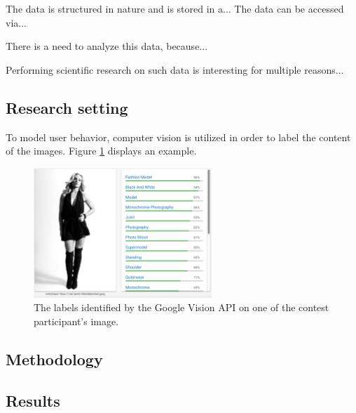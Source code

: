     The data is structured in nature and is stored in a... The data can be accessed via...

    There is a need to analyze this data, because...

    Performing scientific research on such data is interesting for multiple reasons...

\subsection{Research setting}
    To model user behavior, computer vision is utilized in order to label the content of the images. Figure \ref{google_vision_labels} displays an example.  

    \begin{figure}[h] 
		\begin{center}
			\includegraphics[width=0.6\textwidth]{images/google_vision_labels.png}
			\caption{The labels identified by the Google Vision API on one of the contest participant's image.}
			\label{google_vision_labels}
		\end{center}
	\end{figure}

\subsection{Methodology}

\subsection{Results}
